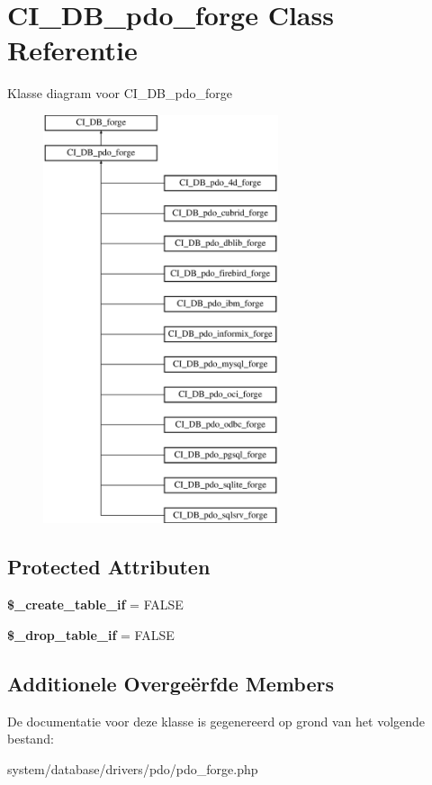 \hypertarget{class_c_i___d_b__pdo__forge}{}\section{C\+I\+\_\+\+D\+B\+\_\+pdo\+\_\+forge Class Referentie}
\label{class_c_i___d_b__pdo__forge}
Klasse diagram voor C\+I\+\_\+\+D\+B\+\_\+pdo\+\_\+forge\begin{figure}[H]
\begin{center}
\leavevmode
\includegraphics[height=12.000000cm]{class_c_i___d_b__pdo__forge}
\end{center}
\end{figure}
\subsection*{Protected Attributen}
\begin{DoxyCompactItemize}
\item 
\mbox{\label{class_c_i___d_b__pdo__forge_a2f6484fcb8d1dc3eef67a637227cd583}} 
{\bfseries \$\+\_\+create\+\_\+table\+\_\+if} = F\+A\+L\+SE
\item 
\mbox{\label{class_c_i___d_b__pdo__forge_a92a8a9145a7fc91e252e58d019373581}} 
{\bfseries \$\+\_\+drop\+\_\+table\+\_\+if} = F\+A\+L\+SE
\end{DoxyCompactItemize}
\subsection*{Additionele Overge\"{e}rfde Members}


De documentatie voor deze klasse is gegenereerd op grond van het volgende bestand\+:\begin{DoxyCompactItemize}
\item 
system/database/drivers/pdo/pdo\+\_\+forge.\+php\end{DoxyCompactItemize}
